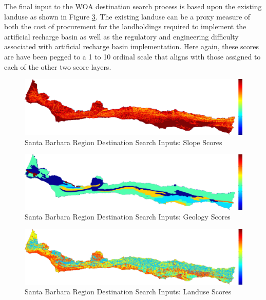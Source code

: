 The final input to the WOA destination search process is based upon the existing landuse as shown in Figure \ref{fig:SBdsinputs_landuse}. The existing landuse can be a proxy measure of both the cost of procurement for the landholdings required to implement the artificial recharge basin as well as the regulatory and engineering difficulty associated with artificial recharge basin implementation. Here again, these scores are have been pegged to a 1 to 10 ordinal scale that aligns with those assigned to each of the other two score layers. 

        \begin{figure}[!h]
            \begin{center}
            \includegraphics[width=5.5in]{figures/SantaBarbara_Search_Slope.png}   
            \caption{Santa Barbara Region Destination Search Inputs: Slope Scores}
            \label{fig:SBdsinputs_slope}
            \end{center}
        \end{figure}
        
        \begin{figure}[!h]
            \begin{center}
            \includegraphics[width=5.5in]{figures/SantaBarbara_Search_Geology.png}   
            \caption{Santa Barbara Region Destination Search Inputs: Geology Scores}
            \label{fig:SBdsinputs_geology}
            \end{center}
        \end{figure}
    
        \begin{figure}[!h]
            \begin{center}
            \includegraphics[width=5.5in]{figures/SantaBarbara_Search_Landuse.png}   
            \caption{Santa Barbara Region Destination Search Inputs: Landuse Scores}
            \label{fig:SBdsinputs_landuse}
            \end{center}
        \end{figure}
    
